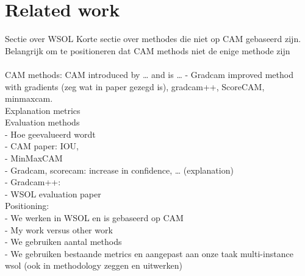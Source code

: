 \chapter{Related work}

Sectie over WSOL
Korte sectie over methodes die niet op CAM gebaseerd zijn. Belangrijk om te positioneren dat CAM methods niet de enige methode zijn \\\\
CAM methods: CAM introduced by … and is … 
- Gradcam improved method with gradients (zeg wat in paper gezegd is), gradcam++, ScoreCAM, minmaxcam. 
\\
Explanation metrics \\
Evaluation methods \\
- Hoe geevalueerd wordt \\
- CAM paper: IOU,\\
- MinMaxCAM\\
- Gradcam, scorecam: increase in confidence, … (explanation) \\
- Gradcam++: \\
- WSOL evaluation paper\\
Positioning:\\
- We werken in WSOL en is gebaseerd op CAM\\
- My work versus other work\\
- We gebruiken aantal methods\\
- We gebruiken bestaande metrics en aangepast aan onze taak multi-instance wsol (ook in methodology zeggen en uitwerken)\\



